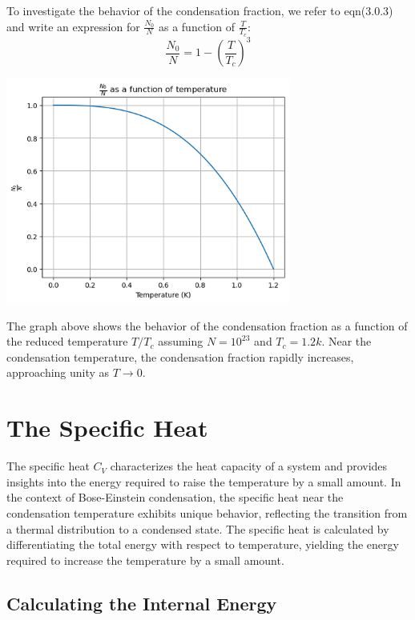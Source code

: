 \documentclass{article}
\numberwithin{equation}{section}
\numberwithin{equation}{subsection}
\begin{document}
To investigate the behavior of the condensation fraction, we refer to eqn(3.0.3) and write an expression for $\frac{N_0}{N}$ as a function of $\frac{T}{T_c}$:
\begin{equation}
    \frac{N_0}{N} = 1 - \left(\frac{T}{T_c}\right)^3
\end{equation}
\begin{center}
    \includegraphics[width=0.7\textwidth]{N_0N_graph_high_quality.png}  
\end{center}
The graph above shows the behavior of the condensation fraction as a function of the reduced temperature \( T/T_c \) assuming $N = 10^{23}$ and $T_c = 1.2k$. Near the condensation temperature, the condensation fraction rapidly increases, approaching unity as \( T \to 0 \). 

\section{The Specific Heat}
The specific heat \( C_V \) characterizes the heat capacity of a system and provides insights into the energy required to raise the temperature by a small amount. In the context of Bose-Einstein condensation, the specific heat near the condensation temperature exhibits unique behavior, reflecting the transition from a thermal distribution to a condensed state. The specific heat is calculated by differentiating the total energy with respect to temperature, yielding the energy required to increase the temperature by a small amount.\\
\subsection{Calculating the Internal Energy}
\end{document}
